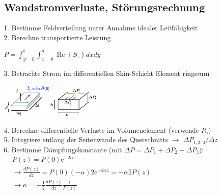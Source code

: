 \documentclass[english]{latex4ei/latex4ei_sheet}
\begin{document}
\begin{sectionbox}
    \subsection{Wandstromverluste, Störungsrechnung}
    1. Bestimme Feldverteilung unter Annahme idealer Leitfähigkeit\\
    2. Berechne transportierte Leistung\\
    \begin{emphbox}
        $P=\int_{y=0}^{b} \int_{x=0}^{a} \operatorname{Re}\left\{S_{z}\right\} d x d y$\\
    \end{emphbox}
    3. Betrachte Strom im differentiellen Skin-Schicht Element ringsrum
    \begin{center}\includegraphics[width = 2.5cm]{./img/verluste-hl.png}\includegraphics[width = 2.5cm]{./img/hl-verluste2.png}\end{center}
    4. Berechne differentielle Verluste im Volumenelement (verwende $R_{\square}$)\\
    5. Integriere entlang der Seitenwände des Querschnitts $\rightarrow$ $\Delta P_{1,2,3} / \Delta z$\\
    6. Bestimme Dämpfungskonstante (mit $\Delta P = \Delta P_{1}+\Delta P_{2}+\Delta P_{3})$:\\
    $\begin{aligned}
             & P(z)=P(0) \mathrm{e}^{-2 \alpha z}                                                     \\
             & \rightarrow \frac{d P(z)}{d z}=P(0)(-\alpha) 2 \mathrm{e}^{-2 \alpha z}=-\alpha 2 P(z) \\
             & \rightarrow \alpha=-\frac{1}{2} \frac{d P(z)}{d z} \frac{1}{P(z)}
        \end{aligned}$\\


\end{sectionbox}
\end{document}
